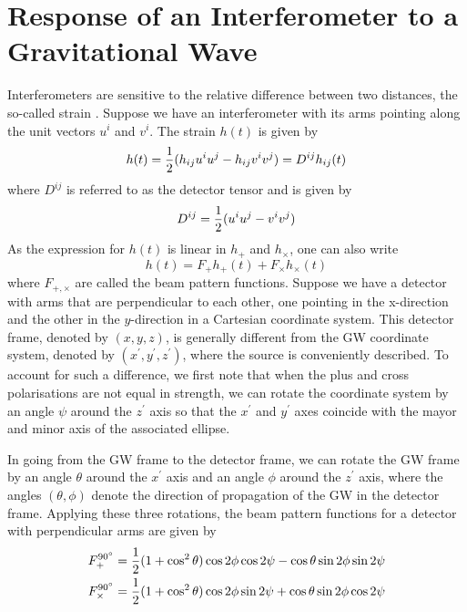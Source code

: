 \documentclass[binding=0.6cm, LaM]{sapthesis}
\begin{document}
\section{Response of an Interferometer to a Gravitational Wave}
        Interferometers are sensitive to the relative difference between two distances, the so-called strain \cite{6} .
        Suppose we have an interferometer with its arms pointing along the unit vectors $u^i$ and $v^i$. The strain $h(t)$ is given by
        \begin{equation}
          h(t) = {1 \over 2} (h_{ij}u^iu^j - h_{ij}v^iv^j) = D^{ij}h_{ij}(t)
        \end{equation}
        where $D^{ij}$ is referred to as the detector tensor and is given by
        \begin{equation}
          D^{ij} = {1\over 2} (u^iu^j -v^iv^j)
        \end{equation}
        As the expression for $h(t)$ is linear in $h_{+}$ and $h_{\times}$, one can also write
        \begin{equation}
          \label{beampattern}
          h(t) = F_{+}h_{+} (t) + F_{\times}h_{\times}(t)
        \end{equation}
        where $F_{+,\times}$ are called the beam pattern functions. Suppose we have a detector
        with arms that are perpendicular to each other, one pointing in the x-direction and the other
        in the $y$-direction in a Cartesian coordinate system. This detector frame, denoted by $(x,y,z)$,
        is generally different from the GW coordinate system, denoted by $(x^\prime,y^\prime,z^\prime)$, where the source
        is conveniently described. To account for such a difference, we first note that when the plus
        and cross polarisations are not equal in strength, we can rotate the coordinate system by
        an angle $\psi$ around the $z^\prime$ axis so that the $x^\prime$ and $y^\prime$ axes
        coincide with the mayor and minor axis of the associated ellipse.

        In going from the GW frame to the detector frame, we can rotate the GW frame by
        an angle $\theta$ around the $x^\prime$ axis and an angle $\phi$ around the $z^\prime$ axis,
        where the angles $(\theta, \phi)$ denote the direction of propagation of the GW in the detector frame.
        Applying these three rotations, the beam pattern functions for a detector with perpendicular arms are given by
        \begin{align}
          F_{+}^{\ang{90}}& = {1 \over 2} (1 + \cos^2 \theta)\cos 2\phi \cos 2 \psi - \cos \theta \sin2\phi \sin2\psi \\
          F_{\times}^{\ang{90}}& = {1 \over 2} (1 + \cos^2 \theta)\cos 2\phi \sin 2 \psi + \cos \theta \sin2\phi \cos2\psi
        \end{align}
        
\end{document}
